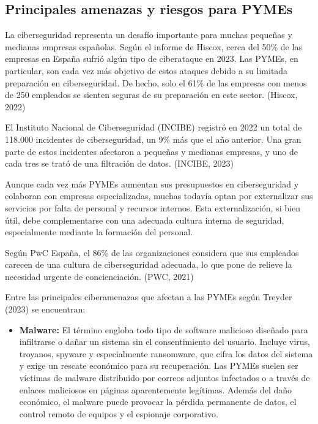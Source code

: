 \documentclass[a4paper, 10pt]{article}
\begin{document}
\subsection{Principales amenazas y riesgos para PYMEs}

La ciberseguridad representa un desafío importante para muchas pequeñas y medianas empresas españolas. Según el informe de Hiscox, cerca del 50\% de las empresas en España sufrió algún tipo de ciberataque en 2023. Las PYMEs, en particular, son cada vez más objetivo de estos ataques debido a su limitada preparación en ciberseguridad. De hecho, solo el 61\% de las empresas con menos de 250 empleados se sienten seguras de su preparación en este sector. (Hiscox, 2022) \cite{hiscox}
\par\vspace{0.5cm}

El Instituto Nacional de Ciberseguridad (INCIBE) registró en 2022 un total de 118.000 incidentes de ciberseguridad, un 9\% más que el año anterior. Una gran parte de estos incidentes afectaron a pequeñas y medianas empresas, y uno de cada tres se trató de una filtración de datos. (INCIBE, 2023) \cite{incibe2023}
\par\vspace{0.5cm}

Aunque cada vez más PYMEs aumentan sus presupuestos en ciberseguridad y colaboran con empresas especializadas, muchas todavía optan por externalizar sus servicios por falta de personal y recursos internos. Esta externalización, si bien útil, debe complementarse con una adecuada cultura interna de seguridad, especialmente mediante la formación del personal.
\par\vspace{0.5cm}

Según PwC España, el 86\% de las organizaciones considera que sus empleados carecen de una cultura de ciberseguridad adecuada, lo que pone de relieve la necesidad urgente de concienciación. (PWC, 2021) \cite{pow}
\par\vspace{0.5cm}

Entre las principales ciberamenazas que afectan a las PYMEs según Treyder (2023) se encuentran:

\begin{itemize}
    \item \textbf{Malware:}  
    El término engloba todo tipo de software malicioso diseñado para infiltrarse o dañar un sistema sin el consentimiento del usuario. Incluye virus, troyanos, spyware y especialmente ransomware, que cifra los datos del sistema y exige un rescate económico para su recuperación. Las PYMEs suelen ser víctimas de malware distribuido por correos adjuntos infectados o a través de enlaces maliciosos en páginas aparentemente legítimas. Además del daño económico, el malware puede provocar la pérdida permanente de datos, el control remoto de equipos y el espionaje corporativo.
\end{itemize}
\end{document}

